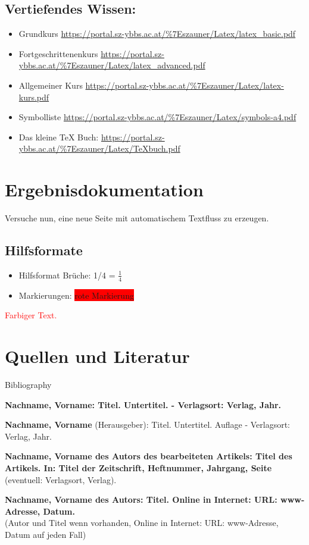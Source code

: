 \section{Vertiefendes Wissen:}

\begin{itemize}
 \item Grundkurs \url{https://portal.sz-ybbs.ac.at/%7Eszauner/Latex/latex_basic.pdf}
 \item Fortgeschrittenenkurs \url{https://portal.sz-ybbs.ac.at/%7Eszauner/Latex/latex_advanced.pdf}
 \item Allgemeiner Kurs \url{https://portal.sz-ybbs.ac.at/%7Eszauner/Latex/latex-kurs.pdf}
 \item Symbolliste \url{https://portal.sz-ybbs.ac.at/%7Eszauner/Latex/symbols-a4.pdf}
 \item Das kleine TeX Buch: \url{https://portal.sz-ybbs.ac.at/%7Eszauner/Latex/TeXbuch.pdf}
\end{itemize}



\chapter{Ergebnisdokumentation}

Versuche nun, eine neue Seite mit automatischem Textfluss zu erzeugen.

\section{Hilfsformate}

\begin{itemize}
 \item Hilfsformat Brüche: 1/4 = $\frac{1}{4}$
 \item Markierungen: \color{black}\colorbox{red}{rote Markierung}
\end{itemize}


\textcolor{red}{Farbiger Text.}


\chapter*{Quellen und Literatur}

Bibliography

\textbf{Nachname, Vorname: Titel. Untertitel. - Verlagsort: Verlag, Jahr.}

\textbf{Nachname, Vorname} (Herausgeber): Titel. Untertitel. Auflage - Verlagsort: Verlag, Jahr.

\textbf{Nachname, Vorname des Autors des bearbeiteten Artikels: Titel des Artikels. In: Titel der
Zeitschrift, Heftnummer, Jahrgang, Seite} (eventuell: Verlagsort, Verlag).

\textbf{Nachname, Vorname des Autors: Titel. Online in Internet: URL: www-Adresse, Datum.}\\
(Autor und Titel wenn vorhanden, Online in Internet: URL: www-Adresse, Datum auf jeden Fall)


